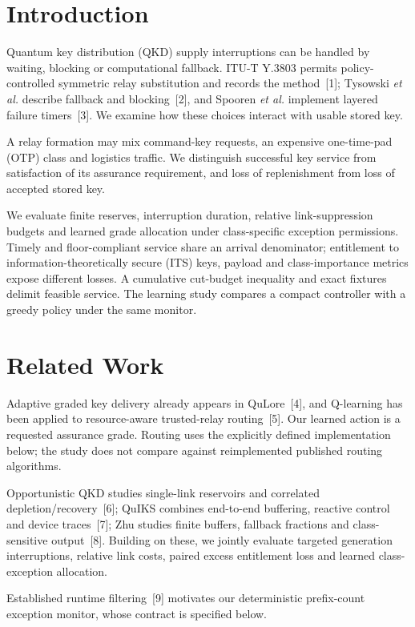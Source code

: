 \documentclass[conference,a4paper]{IEEEtran}
\begin{document}
\section{Introduction}
Quantum key distribution (QKD) supply interruptions can be handled by waiting, blocking or computational fallback. ITU-T Y.3803 permits policy-controlled symmetric relay substitution and records the method~[1]; Tysowski \emph{et al.} describe fallback and blocking~[2], and Spooren \emph{et al.} implement layered failure timers~[3]. We examine how these choices interact with usable stored key.

A relay formation may mix command-key requests, an expensive one-time-pad (OTP) class and logistics traffic. We distinguish successful key service from satisfaction of its assurance requirement, and loss of replenishment from loss of accepted stored key.

We evaluate finite reserves, interruption duration, relative link-suppression budgets and learned grade allocation under class-specific exception permissions. Timely and floor-compliant service share an arrival denominator; entitlement to information-theoretically secure (ITS) keys, payload and class-importance metrics expose different losses. A cumulative cut-budget inequality and exact fixtures delimit feasible service. The learning study compares a compact controller with a greedy policy under the same monitor.

\section{Related Work}
Adaptive graded key delivery already appears in QuLore~[4], and Q-learning has been applied to resource-aware trusted-relay routing~[5]. Our learned action is a requested assurance grade. Routing uses the explicitly defined implementation below; the study does not compare against reimplemented published routing algorithms.

Opportunistic QKD studies single-link reservoirs and correlated depletion/recovery~[6]; QuIKS combines end-to-end buffering, reactive control and device traces~[7]; Zhu studies finite buffers, fallback fractions and class-sensitive output~[8]. Building on these, we jointly evaluate targeted generation interruptions, relative link costs, paired excess entitlement loss and learned class-exception allocation.

Established runtime filtering~[9] motivates our deterministic prefix-count exception monitor, whose contract is specified below.
\end{document}
